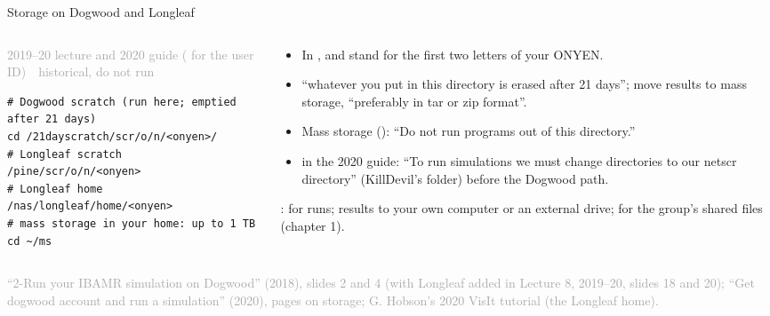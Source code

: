 \documentclass[aspectratio=169,11pt]{beamer}
\newcommand{\sourcecredit}[1]{\vfill\begin{flushright}\tiny\textcolor{DarkGray}{#1}\end{flushright}}
\newcommand{\hist}[1]{{\tiny\sffamily\textcolor{DarkGray}{#1\ \textbullet\ historical, do not run}}\par\nointerlineskip\vspace{0.3mm}}
\begin{document}
\begin{frame}[fragile]{Storage on Dogwood and Longleaf}
\label{fr:dwstorage}
\begin{columns}[T,onlytextwidth]
\begin{column}{0.5\textwidth}
\hist{2019--20 lecture and 2020 guide ( for the user ID)}
\begin{lstlisting}[style=hist]
# Dogwood scratch (run here; emptied after 21 days)
cd /21dayscratch/scr/o/n/<onyen>/
# Longleaf scratch
/pine/scr/o/n/<onyen>
# Longleaf home
/nas/longleaf/home/<onyen>
# mass storage in your home: up to 1 TB
cd ~/ms
\end{lstlisting}
\end{column}
\begin{column}{0.47\textwidth}
\footnotesize
\begin{itemize}\setlength{\itemsep}{2pt}
  \item In ,  and  stand for the first two letters of your ONYEN.
  \item ``whatever you put in this directory is erased after 21 days''; move results to mass storage, ``preferably in tar or zip format''.
  \item Mass storage (): ``Do not run programs out of this directory.''
  \item {} in the 2020 guide: ``To run simulations we must change directories to our netscr directory'' (KillDevil's folder) before the Dogwood path.
\end{itemize}
\vspace{1mm}
:  for runs; results to your own computer or an external drive;  for the group's shared files (chapter 1).
\end{column}
\end{columns}
\sourcecredit{``2-Run your IBAMR simulation on Dogwood'' (2018), slides 2 and 4 (with Longleaf added in Lecture 8, 2019--20, slides 18 and 20); ``Get dogwood account and run a simulation'' (2020), pages on storage; G. Hobson's 2020 VisIt tutorial (the Longleaf home).}
\end{frame}
\end{document}
